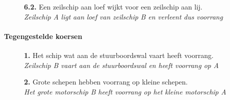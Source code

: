 \vspace{-0.7cm}
\begin{figure}[H]
	\centering
	\hspace{0.02\textwidth}
	\begin{minipage}[t]{0.70\textwidth}
		\textbf{6.2.} Een zeilschip aan loef wijkt voor een zeilschip aan lij.\\
		\textit{Zeilschip A ligt aan loef van zeilschip B en verleent dus voorrang}
	\end{minipage}
	\hfill
	\begin{minipage}[t]{0.20\textwidth}
		\label{pic:kr42}
	\end{minipage}
	\hfill
\end{figure}


\paragraph{Tegengestelde koersen}
\vspace{-0.2cm}
\begin{figure}[H]
	\centering
	\begin{minipage}[t]{0.70\textwidth}
		\textbf{1.} Het schip wat aan de stuurboordswal vaart heeft voorrang.\\
		\textit{Zeilschip B vaart aan de stuurboordswal en heeft voorrang op A}
	\end{minipage}
	\hfill
	\begin{minipage}[t]{0.25\textwidth}
		\label{pic:tg1}
	\end{minipage}
	\hfill
\end{figure}
\vspace{-0.7cm}

\begin{figure}[H]
	\centering
	\begin{minipage}[t]{0.70\textwidth}
		\textbf{2.} Grote schepen hebben voorrang op kleine schepen.\\
		\textit{Het grote motorschip B heeft voorrang op het kleine motorschip A}
	\end{minipage}
	\hfill
	\begin{minipage}[t]{0.25\textwidth}
		\label{pic:tg2}
	\end{minipage}
	\hfill
\end{figure}
\vspace{-0.7cm}

